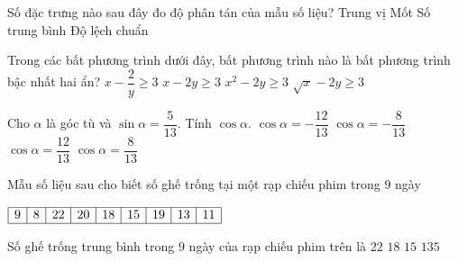 \begin{ex}%
	Số đặc trưng nào sau đây đo độ phân tán của mẫu số liệu?
	\choice
	{Trung vị}
	{Mốt}
	{Số trung bình}
	{\True Độ lệch chuẩn}
\end{ex}
\begin{ex}%
	Trong các bất phương trình dưới đây, bất phương trình nào là bất phương trình bậc nhất hai ẩn?
	\choice
	{$x-\dfrac{2}{y}\ge 3$}
	{\True $x-2y\ge 3$}
	{$x^2-2y\ge 3$}
	{$\sqrt{x}-2y\ge 3$}
\end{ex}
\begin{ex}%
	Cho $\alpha$ là góc tù và $\sin\alpha=\dfrac{5}{13}$. Tính $\cos\alpha$.
	\choice
	{\True $\cos\alpha=-\dfrac{12}{13}$}
	{$\cos\alpha=-\dfrac{8}{13}$}
	{$\cos\alpha=\dfrac{12}{13}$}
	{$\cos\alpha=\dfrac{8}{13}$}
\end{ex}
\begin{ex}%
	Mẫu số liệu sau cho biết số ghế trống tại một rạp chiếu phim trong $9$ ngày
	\begin{center}
		$\begin{array}{|c|c|c|c|c|c|c|c|c|}
		\hline
		9 & 8 & 22 & 20 & 18 & 15 & 19 & 13 & 11 \\
		\hline
	\end{array}$
	\end{center}
	Số ghế trống trung bình trong $9$ ngày của rạp chiếu phim trên là
	\choice
	{$22$}
	{$18$}
	{\True $15$}
	{$135$}
\end{ex}
